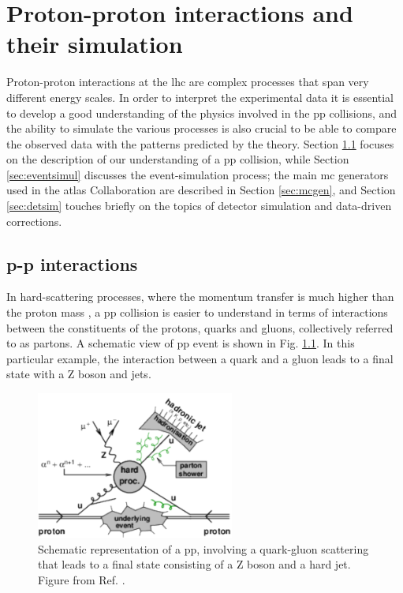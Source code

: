 \chapter{Proton-proton interactions and their simulation}
\label{chap:event:MC}

Proton-proton interactions at the \gls{lhc} are complex processes that span very different energy scales. 
In order to interpret the experimental data it is essential to develop a good understanding of the physics involved in the \gls{pp} collisions, and the ability to simulate the various processes is also crucial to be able to compare the observed data with the patterns predicted by the theory.
Section \ref{sec:ppint} focuses on the description of our understanding of a \gls{pp} collision, while Section \ref{sec:eventsimul} 
discusses the event-simulation process; 
the main \gls{mc} generators used in the \gls{atlas} Collaboration are described in Section \ref{sec:mcgen}, and Section \ref{sec:detsim} touches briefly on the topics of detector simulation and data-driven corrections.



\section{p-p interactions}
\label{sec:ppint}

In hard-scattering processes, where the momentum transfer is much higher than the proton mass \cite{Butterworth:2012fj}, 
a \gls{pp} collision is easier to understand in terms of interactions between the constituents of the protons, quarks and gluons, 
collectively referred to as partons. A schematic view of \gls{pp} event is shown in Fig. \ref{fig:sim:pp2}. In this particular example, the interaction between a quark and a gluon leads to a final state with a Z boson and jets. 

\begin{figure}[h]
\begin{center}
    \includegraphics[width=0.58\textwidth]{figures/simul/ppcoll2}
\end{center}
 \caption{Schematic representation of a \gls{pp}, involving a quark-gluon scattering that leads to a final state consisting of a Z boson and a hard jet. Figure from Ref. \cite{Butterworth:2012fj}.}
  \label{fig:sim:pp2}
\end{figure}

